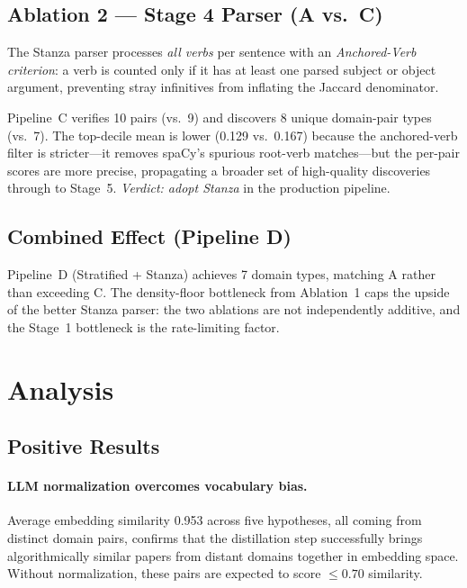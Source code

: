\documentclass[11pt]{article}
\begin{document}
\subsection{Ablation 2 --- Stage 4 Parser (A vs.\ C)}

The Stanza parser \citep{qi2020stanza} processes \emph{all verbs} per
sentence with an \emph{Anchored-Verb criterion}: a verb is counted only
if it has at least one parsed subject or object argument, preventing stray
infinitives from inflating the Jaccard denominator.

Pipeline~C verifies 10 pairs (vs.\ 9) and discovers 8 unique domain-pair
types (vs.\ 7). The top-decile mean is lower (0.129 vs.\ 0.167) because
the anchored-verb filter is stricter---it removes spaCy's spurious
root-verb matches---but the per-pair scores are more precise, propagating
a broader set of high-quality discoveries through to Stage~5.
\textit{Verdict: adopt Stanza} in the production pipeline.

\subsection{Combined Effect (Pipeline D)}

Pipeline~D (Stratified + Stanza) achieves 7 domain types,
matching A rather than exceeding C. The density-floor bottleneck from
Ablation~1 caps the upside of the better Stanza parser: the two ablations
are not independently additive, and the Stage~1 bottleneck is the
rate-limiting factor.

\section{Analysis}

\subsection{Positive Results}

\paragraph{LLM normalization overcomes vocabulary bias.}
Average embedding similarity 0.953 across five hypotheses, all coming from
distinct domain pairs, confirms that the distillation step successfully
brings algorithmically similar papers from distant domains together in
embedding space. Without normalization, these pairs are expected to score
$\leq 0.70$ similarity.
\end{document}
